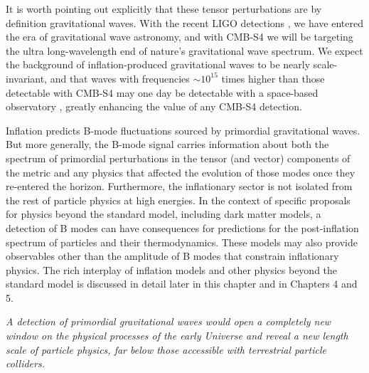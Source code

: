 It is worth pointing out explicitly that these tensor perturbations are by definition gravitational waves. With the recent LIGO detections \cite{Abbott:2016blz,Abbott:2016nmj}, we have entered the era of gravitational wave astronomy, and with CMB-S4 we will be targeting the ultra long-wavelength end of nature's gravitational wave spectrum. We expect the background of inflation-produced gravitational waves to be nearly scale-invariant, and that waves with frequencies $\sim 10^{15}$ times higher than those detectable with CMB-S4 may one day be detectable with a space-based observatory \cite{Caligiuri:2014sla}, greatly enhancing the value of any CMB-S4 detection. 

Inflation predicts B-mode fluctuations sourced by primordial gravitational waves. But more generally, the B-mode signal carries information about both the spectrum of primordial perturbations in the tensor (and vector) components of the metric and any physics that affected the evolution of those modes once they re-entered the horizon. Furthermore, the inflationary sector is not isolated from the rest of particle physics at high energies. In the context of specific proposals for physics beyond the standard model, including dark matter models, a detection of B modes can have consequences for predictions for the post-inflation spectrum of particles and their thermodynamics. These models may also provide observables other than the amplitude of B modes that constrain inflationary physics. The rich interplay of inflation models and other physics beyond the standard model is discussed in detail later in this chapter and in Chapters 4 and 5.


{\it A detection of primordial gravitational waves would open a completely new window on the physical processes of the early Universe and reveal a new length scale of particle physics, far below those accessible with terrestrial particle colliders. }

